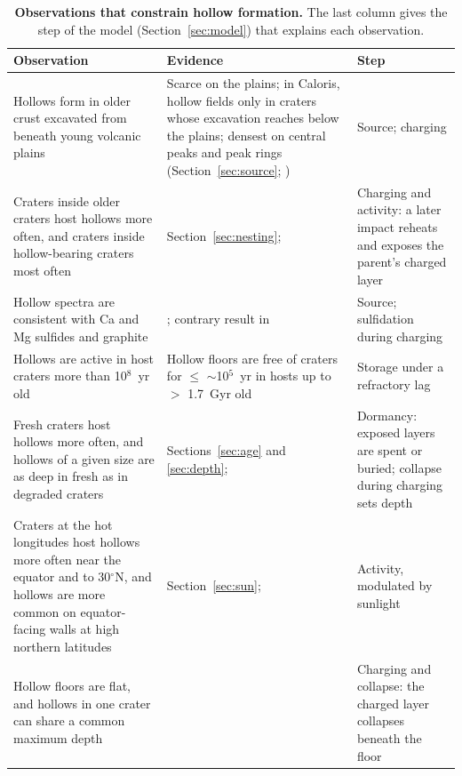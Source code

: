 \documentclass[article,review]{planetary}
\begin{document}
\begin{table}[!ht]
    \mytablestyle
    \caption{{\bf Observations that constrain hollow formation.} The last column gives the step of the model (Section~\ref{sec:model}) that explains each observation.}
    \scriptsize{
        \begin{tabularx}{\textwidth}{>{\raggedright\arraybackslash}p{4.0cm} >{\raggedright\arraybackslash}X >{\raggedright\arraybackslash}p{5.0cm}}
            \toprule
            \textbf{Observation} & \textbf{Evidence} & \textbf{Step} \\
            \hline
            Hollows form in older crust excavated from beneath young volcanic plains & Scarce on the plains; in Caloris, hollow fields only in craters whose excavation reaches below the plains; densest on central peaks and peak rings (Section~\ref{sec:source}; \textcite{blewett2013,thomas2014}) & Source; charging \\
            Craters inside older craters host hollows more often, and craters inside hollow-bearing craters most often & Section~\ref{sec:nesting}; \textcite{giroud2024,detoffoli2024} & Charging and activity: a later impact reheats and exposes the parent's charged layer \\
            Hollow spectra are consistent with Ca and Mg sulfides and graphite & \textcite{vilas2016,helbert2013,thomas2016,lucchetti2018,barraud2020,emran2025}; contrary result in \textcite{lucchetti2021} & Source; sulfidation during charging \\
            Hollows are active in host craters more than 10$^8$~yr old & Hollow floors are free of craters for $\leq$ $\sim$10$^5$~yr \parencite{wang2020} in hosts up to $>$ 1.7~Gyr old \parencite{blewett2013,banks2017} & Storage under a refractory lag \\
            Fresh craters host hollows more often, and hollows of a given size are as deep in fresh as in degraded craters & Sections~\ref{sec:age} and \ref{sec:depth}; \textcite{detoffoli2024} & Dormancy: exposed layers are spent or buried; collapse during charging sets depth \\
            Craters at the hot longitudes host hollows more often near the equator and to 30$^\circ$N, and hollows are more common on equator-facing walls at high northern latitudes & Section~\ref{sec:sun}; \textcite{detoffoli2024,deutsch2025} & Activity, modulated by sunlight \\
            Hollow floors are flat, and hollows in one crater can share a common maximum depth & \textcite{vaughan2012,blewett2013,thomas2014,blewett2016} & Charging and collapse: the charged layer collapses beneath the floor \\

\end{tabularx}}
\end{table}
\end{document}
